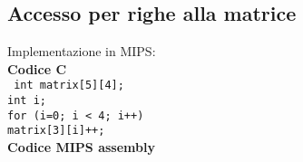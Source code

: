 \documentclass[../main.tex]{subfiles}
\begin{document}
\subsection{Accesso per righe alla matrice}
Implementazione in MIPS:
\\[5mm]
\hspace*{5mm} \textbf{Codice C} \\
\texttt{
    \hspace*{4mm} int matrix[5][4]; \\
    \hspace*{4mm} int i; \\
    \hspace*{4mm} for (i=0; i < 4; i++) \\
    \hspace*{4mm} \hspace*{0cm} \hspace*{0cm} \hspace*{0cm} \hspace*{0cm} matrix[3][i]++; \\[3mm]
}
\hspace*{5mm} \textbf{Codice MIPS assembly} \\
\end{document}
